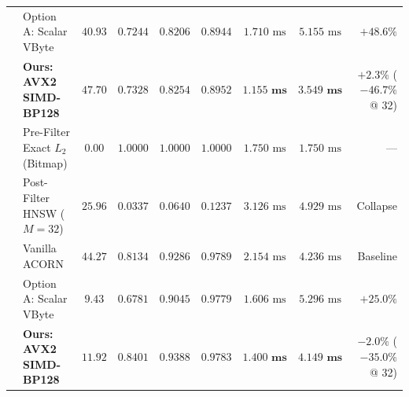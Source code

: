 \begin{table}[t]
\begin{tabular}{@{}llccccccr@{}}
 & Option A: Scalar VByte & $40.93$ & $0.7244$ & $0.8206$ & $0.8944$ & $1.710\text{ ms}$ & $5.155\text{ ms}$ & $+48.6\%$ \\
 & \textbf{Ours: AVX2 SIMD-BP128} & $\mathbf{47.70}$ & $\mathbf{0.7328}$ & $\mathbf{0.8254}$ & $\mathbf{0.8952}$ & $\mathbf{1.155\text{ ms}}$ & $\mathbf{3.549\text{ ms}}$ & $\mathbf{+2.3\%}$ (\textbf{$-46.7\%$} @ 32) \\
\midrule
{}
 & Pre-Filter Exact $L_2$ (Bitmap) & $0.00$ & $1.0000$ & $1.0000$ & $1.0000$ & $1.750\text{ ms}$ & $1.750\text{ ms}$ & --- \\
 & Post-Filter HNSW ($M=32$) & $25.96$ & $0.0337$ & $0.0640$ & $0.1237$ & $3.126\text{ ms}$ & $4.929\text{ ms}$ & Collapse \\
 & Vanilla ACORN & $44.27$ & $0.8134$ & $0.9286$ & $0.9789$ & $2.154\text{ ms}$ & $4.236\text{ ms}$ & Baseline \\
 & Option A: Scalar VByte & $9.43$ & $0.6781$ & $0.9045$ & $0.9779$ & $1.606\text{ ms}$ & $5.296\text{ ms}$ & $+25.0\%$ \\
 & \textbf{Ours: AVX2 SIMD-BP128} & $\mathbf{11.92}$ & $\mathbf{0.8401}$ & $\mathbf{0.9388}$ & $\mathbf{0.9783}$ & $\mathbf{1.400\text{ ms}}$ & $\mathbf{4.149\text{ ms}}$ & $\mathbf{-2.0\%}$ (\textbf{$-35.0\%$} @ 32) \\
\bottomrule
\end{tabular}
\end{table}


